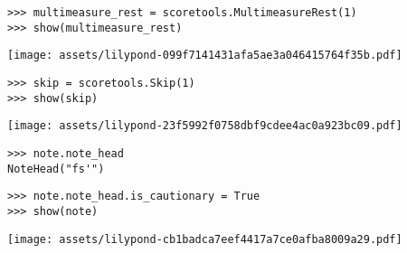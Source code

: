 \begin{comment}
<abjad>
multimeasure_rest = scoretools.MultimeasureRest(1)
show(multimeasure_rest)
</abjad>
\end{comment}

\begin{abjadbookoutput}
\begin{singlespacing}
\vspace{-0.5\baselineskip}
\begin{lstlisting}
>>> multimeasure_rest = scoretools.MultimeasureRest(1)
>>> show(multimeasure_rest)
\end{lstlisting}
\noindent\texttt{[image: assets/lilypond-099f7141431afa5ae3a046415764f35b.pdf]}
\end{singlespacing}
\end{abjadbookoutput}

\begin{comment}
<abjad>
skip = scoretools.Skip(1)
show(skip)
</abjad>
\end{comment}

\begin{abjadbookoutput}
\begin{singlespacing}
\vspace{-0.5\baselineskip}
\begin{lstlisting}
>>> skip = scoretools.Skip(1)
>>> show(skip)
\end{lstlisting}
\noindent\texttt{[image: assets/lilypond-23f5992f0758dbf9cdee4ac0a923bc09.pdf]}
\end{singlespacing}
\end{abjadbookoutput}

\begin{comment}
<abjad>
note.note_head
note.note_head.is_cautionary = True
show(note)
</abjad>
\end{comment}

\begin{abjadbookoutput}
\begin{singlespacing}
\vspace{-0.5\baselineskip}
\begin{lstlisting}
>>> note.note_head
NoteHead("fs'")
\end{lstlisting}
\begin{lstlisting}
>>> note.note_head.is_cautionary = True
>>> show(note)
\end{lstlisting}
\noindent\texttt{[image: assets/lilypond-cb1badca7eef4417a7ce0afba8009a29.pdf]}
\end{singlespacing}
\end{abjadbookoutput}

